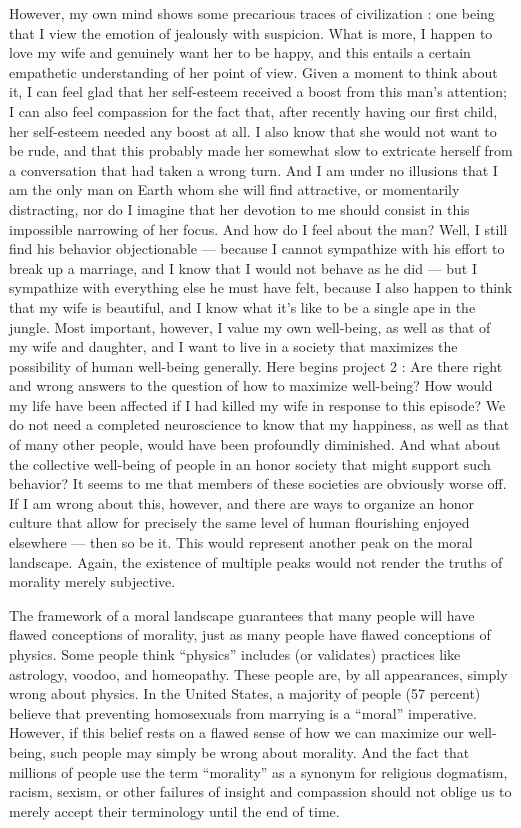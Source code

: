 \documentclass[a4paper,14pt]{extbook}
\begin{document}
However, my own mind shows some precarious traces of civilization :
one being that I view the emotion of jealously with suspicion.
What is more, I happen to love my wife and genuinely want her to be happy, and this entails a certain empathetic understanding of her point of view.
Given a moment to think about it, I can feel glad that her self-esteem received a boost from this man's attention;
I can also feel compassion for the fact that, after recently having our first child, her self-esteem needed any boost at all.
I also know that she would not want to be rude, and that this probably made her somewhat slow to extricate herself from a conversation that had taken a wrong turn.
And I am under no illusions that I am the only man on Earth whom she will find attractive, or momentarily distracting, nor do I imagine that her devotion to me should consist in this impossible narrowing of her focus.
And how do I feel about the man?
Well, I still find his behavior objectionable --- because I cannot sympathize with his effort to break up a marriage, and I know that I would not behave as he did --- but I sympathize with everything else he must have felt, because I also happen to think that my wife is beautiful, and I know what it's like to be a single ape in the jungle.
Most important, however, I value my own well-being, as well as that of my wife and daughter, and I want to live in a society that maximizes the possibility of human well-being generally.
Here begins project 2 :
Are there right and wrong answers to the question of how to maximize well-being?
How would my life have been affected if I had killed my wife in response to this episode?
We do not need a completed neuroscience to know that my happiness, as well as that of many other people, would have been profoundly diminished.
And what about the collective well-being of people in an honor society that might support such behavior?
It seems to me that members of these societies are obviously worse off.
If I am wrong about this, however, and there are ways to organize an honor culture that allow for precisely the same level of human flourishing enjoyed elsewhere --- then so be it.
This would represent another peak on the moral landscape.
Again, the existence of multiple peaks would not render the truths of morality merely subjective.

The framework of a moral landscape guarantees that many people will have flawed conceptions of morality, just as many people have flawed conceptions of physics.
Some people think ``physics'' includes (or validates) practices like astrology, voodoo, and homeopathy.
These people are, by all appearances, simply wrong about physics.
In the United States, a majority of people (57 percent) believe that preventing homosexuals from marrying is a ``moral'' imperative.
However, if this belief rests on a flawed sense of how we can maximize our well-being, such people may simply be wrong about morality.
And the fact that millions of people use the term ``morality'' as a synonym for religious dogmatism, racism, sexism, or other failures of insight and compassion should not oblige us to merely accept their terminology until the end of time.
\end{document}
